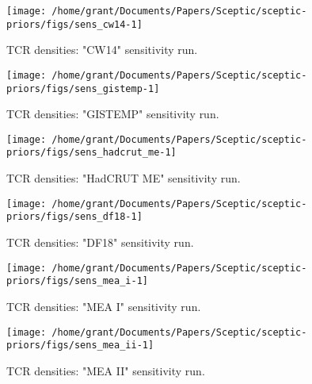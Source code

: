 \documentclass[
]{article}
\begin{document}
\begin{figure}

{\centering \texttt{[image: /home/grant/Documents/Papers/Sceptic/sceptic-priors/figs/sens\_cw14-1]} 

}

\caption{TCR densities: "CW14" sensitivity run.}\label{fig:sens_cw14}
\end{figure}

\begin{figure}

{\centering \texttt{[image: /home/grant/Documents/Papers/Sceptic/sceptic-priors/figs/sens\_gistemp-1]} 

}

\caption{TCR densities: "GISTEMP" sensitivity run.}\label{fig:sens_gistemp}
\end{figure}

\begin{figure}

{\centering \texttt{[image: /home/grant/Documents/Papers/Sceptic/sceptic-priors/figs/sens\_hadcrut\_me-1]} 

}

\caption{TCR densities: "HadCRUT ME" sensitivity run.}\label{fig:sens_hadcrut_me}
\end{figure}

\begin{figure}

{\centering \texttt{[image: /home/grant/Documents/Papers/Sceptic/sceptic-priors/figs/sens\_df18-1]} 

}

\caption{TCR densities: "DF18" sensitivity run.}\label{fig:sens_df18}
\end{figure}

\begin{figure}

{\centering \texttt{[image: /home/grant/Documents/Papers/Sceptic/sceptic-priors/figs/sens\_mea\_i-1]} 

}

\caption{TCR densities: "MEA I" sensitivity run.}\label{fig:sens_mea_i}
\end{figure}

\begin{figure}

{\centering \texttt{[image: /home/grant/Documents/Papers/Sceptic/sceptic-priors/figs/sens\_mea\_ii-1]} 

}

\caption{TCR densities: "MEA II" sensitivity run.}\label{fig:sens_mea_ii}
\end{figure}
\end{document}
